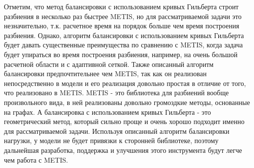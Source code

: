 Отметим, что метод балансировки с использованием кривых Гильберта строит разбиения в несколько раз быстрее METIS, но для рассматриваемой задачи это незначительно, т.к. расчетное время на порядок больше чем время построения разбиения. 
Однако, алгоритм балансировки с использованием кривых Гильберта будет давать существенные преимущества по сравнению с METIS, когда задача будет упираться во время построения разбиения, например, на очень большой расчетной области и с адаптивной сеткой.
Также описанный алгоритм балансировки предпочтительнее чем METIS, так как он реализован непосредственно в модели и его реализация довольно простая в отличие от того, что реализовано в METIS. METIS - это библиотека для разбиений вообще произвольного вида, в ней реализованы довольно громоздкие методы, основанные на графах. А балансировка с использованием кривых Гильберта - это геометрический метод, который сильно проще и очень хорошо подходит именно для рассматриваемой задачи.  
Используя описанный алгоритм балансировки нагрузки, у модели не будет привязки к сторонней библиотеке, поэтому дальнейшая разработка, поддержка и улучшения этого инструмента будут легче чем работа с METIS.
    
    
